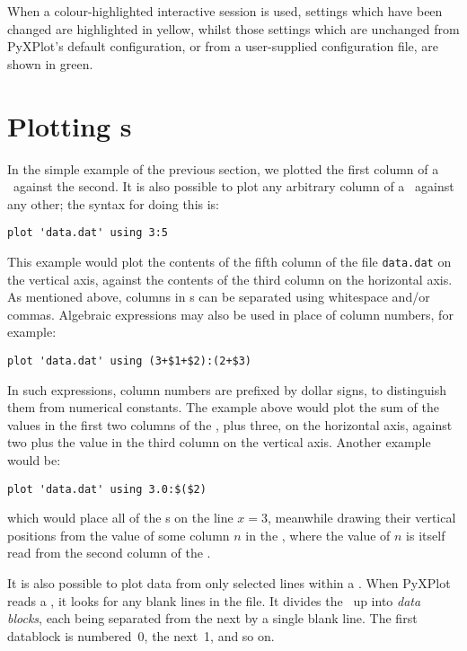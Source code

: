 When a colour-highlighted interactive session is used, settings which have been
changed are highlighted in yellow, whilst those settings which are unchanged
from PyXPlot's default configuration, or from a user-supplied configuration
file, are shown in green.

\section{Plotting \Datafile s}
\label{sec:plot_datafiles}

In the simple example of the previous section, we plotted the first column of a
\datafile\ against the second. It is also possible to plot any arbitrary column
of a \datafile\ against any other; the syntax for doing this is:

\begin{verbatim}
plot 'data.dat' using 3:5
\end{verbatim}

\noindent This example would plot the contents of the fifth column of the file
{\tt data.dat} on the vertical axis, against the contents of the third column
on the horizontal axis. As mentioned above, columns in \datafile s can be
separated using whitespace and/or commas.  Algebraic expressions may also be
used in place of column numbers, for example:

\begin{verbatim}
plot 'data.dat' using (3+$1+$2):(2+$3)
\end{verbatim}

\noindent In such expressions, column numbers are prefixed by dollar signs, to
distinguish them from numerical constants. The example above would plot the sum
of the values in the first two columns of the \datafile, plus three, on the
horizontal axis, against two plus the value in the third column on the vertical
axis. Another example would be:

\begin{verbatim}
plot 'data.dat' using 3.0:$($2)
\end{verbatim}

\noindent which would place all of the \datapoint s on the line $x=3$,
meanwhile drawing their vertical positions from the value of some column $n$ in
the \datafile, where the value of $n$ is itself read from the second column of
the \datafile.

It is also possible to plot data from only selected lines within a \datafile.
When PyXPlot reads a \datafile, it looks for any blank lines in the file. It
divides the \datafile\ up into {\it data blocks}, each being separated from the
next by a single blank line. The first datablock is numbered~0, the next~1, and
so on.  

